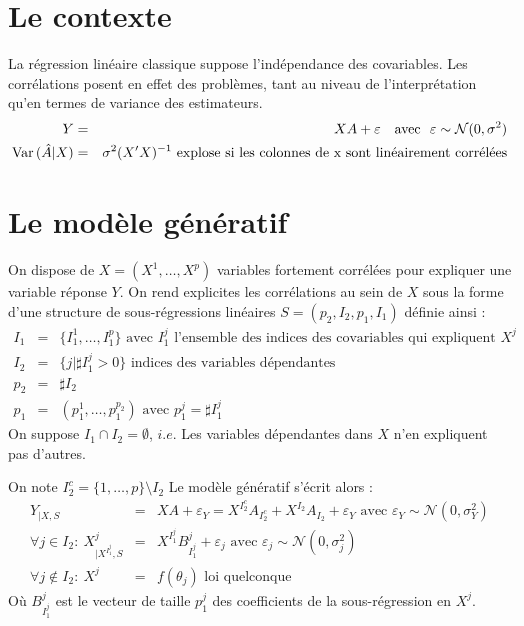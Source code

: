 \documentclass[12pt]{article}
\begin{document}

\section{Le contexte}
	La régression linéaire classique suppose l'indépendance des covariables. Les corrélations posent en effet des problèmes, tant au niveau de l'interprétation qu'en termes de variance des estimateurs.
	\begin{eqnarray}
		Y&=&XA+\varepsilon \ \ \textrm{ avec } \ \varepsilon\sim \mathcal{N}(0,\sigma^2) \\
		{\rm Var}\,(\hat{A}|X)&=& \sigma^2(X'X)^{-1} \textrm{ explose si les colonnes de x sont linéairement corrélées}
	\end{eqnarray}
			
	
	
\section{Le modèle génératif}
On dispose de $X=(X^1,\dots,X^p)$ variables fortement corrélées pour expliquer une variable réponse $Y$.
On rend explicites les corrélations au sein de $X$ sous la forme d'une structure de sous-régressions linéaires $S=(p_2,I_2,p_1,I_1)$ définie ainsi :
	\begin{eqnarray}
		I_1&=&\{I_1^1,\dots,I_1^{p}\} \textrm{ avec $I_1^j$ l'ensemble des indices des covariables qui expliquent $X^j$ \ }		\\
		I_2&=&\{j |\sharp I_1^j>0 \}  \textrm{ indices des variables dépendantes} \\
		p_2&=& \sharp I_2 \\
		p_1&=&(p_1^1,\dots,p_1^{p_2}) \textrm{ avec }p_1^j=\sharp I_1^j 
	\end{eqnarray}
	On suppose $I_1\cap I_2=\emptyset$, $i.e.$ Les variables dépendantes dans $X$ n'en expliquent pas d'autres. 
	
	On note $I_2^c=\{1,\dots,p\}\setminus I_2$
Le modèle génératif s'écrit alors :
\begin{eqnarray}
	Y_{|X,S}&=&XA+\varepsilon_Y= X^{I_2^c}A_{I_2^c}+X^{I_2}A_{I_2}+\varepsilon_Y \textrm{ avec } \varepsilon_Y \sim \mathcal{N}(0,\sigma_Y^2) \label{MainR}\\
	\forall j \in I_2 : \  X^j_{|X^{I_1^j},S}&=&X^{I_1^j}B_{I_1^j}^j + \varepsilon_{j} \textrm{ avec } \varepsilon_j \sim \mathcal{N}(0,\sigma_j^2) \label{SR}\\
    \forall j \notin I_2 : \ X^j &=& f(\theta_j) \textrm{ loi quelconque}	
\end{eqnarray}
Où $B_{I_1^j}^j$ est le vecteur de taille $p_1^j$ des coefficients de la sous-régression en $X^j$.
\end{document}
